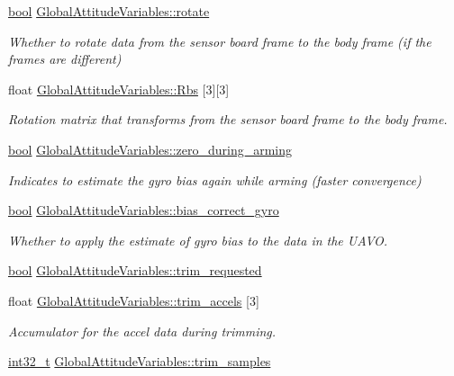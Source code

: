 \begin{DoxyCompactItemize}
\hyperlink{group___exported__types_gaf6a258d8f3ee5206d682d799316314b1}{bool} \hyperlink{group___state_gad5da7bf77c18e9d5990d4b6d6f28477e}{Global\-Attitude\-Variables\-::rotate}
\begin{DoxyCompactList}\small\item\em Whether to rotate data from the sensor board frame to the body frame (if the frames are different) \end{DoxyCompactList}\item 
float \hyperlink{group___state_ga6c34048525801ac0e7e26eb733c759d5}{Global\-Attitude\-Variables\-::\-Rbs} \mbox{[}3\mbox{]}\mbox{[}3\mbox{]}
\begin{DoxyCompactList}\small\item\em Rotation matrix that transforms from the sensor board frame to the body frame. \end{DoxyCompactList}\item 
\hyperlink{group___exported__types_gaf6a258d8f3ee5206d682d799316314b1}{bool} \hyperlink{group___state_gaa625401f5bc69c19b54b3171703f37f9}{Global\-Attitude\-Variables\-::zero\-\_\-during\-\_\-arming}
\begin{DoxyCompactList}\small\item\em Indicates to estimate the gyro bias again while arming (faster convergence) \end{DoxyCompactList}\item 
\hyperlink{group___exported__types_gaf6a258d8f3ee5206d682d799316314b1}{bool} \hyperlink{group___state_ga3df4e05bd900b439ad746cbadce667d5}{Global\-Attitude\-Variables\-::bias\-\_\-correct\-\_\-gyro}
\begin{DoxyCompactList}\small\item\em Whether to apply the estimate of gyro bias to the data in the U\-A\-V\-O. \end{DoxyCompactList}\item 
\hyperlink{group___exported__types_gaf6a258d8f3ee5206d682d799316314b1}{bool} \hyperlink{group___state_ga1b90881e0b0eb5aa9cf39d0ba8ef5e0d}{Global\-Attitude\-Variables\-::trim\-\_\-requested}
\item 
float \hyperlink{group___state_ga8941c16a263cb020587ef58dd38f8281}{Global\-Attitude\-Variables\-::trim\-\_\-accels} \mbox{[}3\mbox{]}
\begin{DoxyCompactList}\small\item\em Accumulator for the accel data during trimming. \end{DoxyCompactList}\item 
\hyperlink{group___n_a_m_e_gafd12020da5a235dfcf0c3c748fb5baed}{int32\-\_\-t} \hyperlink{group___state_ga9e5b2790cd84db83278b3c8c289ea411}{Global\-Attitude\-Variables\-::trim\-\_\-samples}

\end{DoxyCompactItemize}
